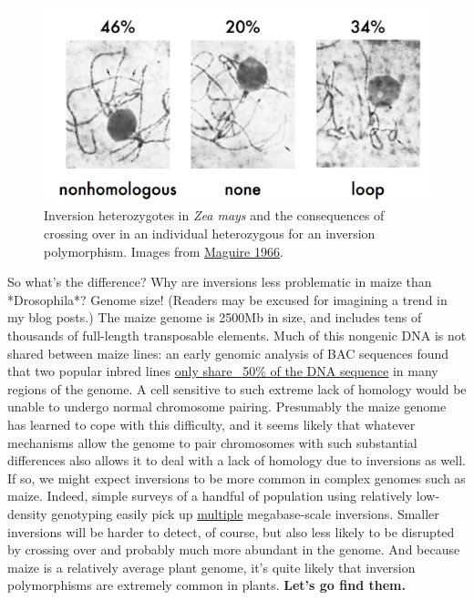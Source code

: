 \documentclass[]{article}
\begin{document}
\begin{figure}[h]   
   \includegraphics[width=0.9\linewidth]{maguire_inversions.png}
   \caption{ Inversion heterozygotes in \textit{Zea mays} and the consequences of crossing over in an individual heterozygous for an inversion polymorphism. Images from \href{http://www.ncbi.nlm.nih.gov/pmc/articles/PMC1211081/}{Maguire 1966}.} 
    \label{fig:maguire}
\end{figure}

So what's the difference? Why are inversions less problematic in maize than *Drosophila*? Genome size! (Readers may be excused for imagining a trend in my blog posts.) 
The maize genome is 2500Mb in size, and includes tens of thousands of full-length transposable elements.  
Much of this nongenic DNA is not shared between maize lines: an early genomic analysis of BAC sequences found that two popular inbred lines \href{http://www.ncbi.nlm.nih.gov/pubmed/15659640}{only share ~50\% of the DNA sequence} in many regions of the genome.  
A cell sensitive to such extreme lack of homology would be unable to undergo normal chromosome pairing.  
Presumably the maize genome has learned to cope with this difficulty, and it seems likely that whatever mechanisms allow the genome to pair chromosomes with such substantial differences also allows it to deal with a lack of homology due to inversions as well. 
If so, we might expect inversions to be more common in complex genomes such as maize. 
Indeed, simple surveys of a handful of population using relatively low-density genotyping easily pick up \href{http://gbe.oxfordjournals.org/content/5/9/1594.short}{multiple} megabase-scale inversions.  
Smaller inversions will be harder to detect, of course, but also less likely to be disrupted by crossing over and probably much more abundant in the genome.  
And because maize is a relatively average plant genome, it's quite likely that inversion polymorphisms are extremely common in plants. {\bf Let's go find them.}
\end{document}

